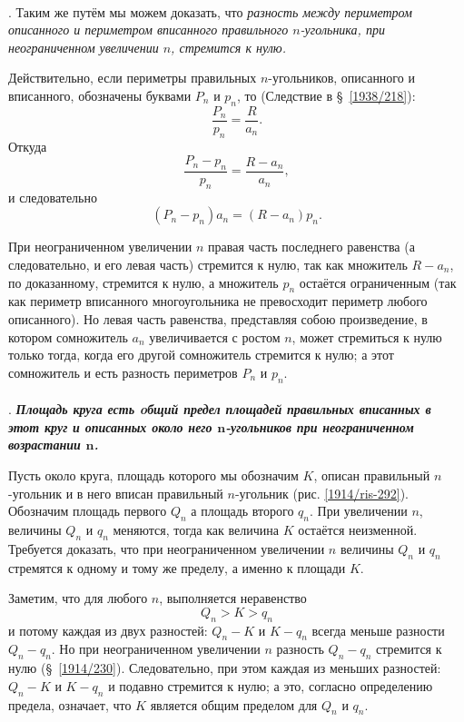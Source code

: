 {\small
\paragraph{}\label{1914/231}
.
Таким же путём мы можем доказать, что \emph{разность между периметром описанного и
периметром вписанного правильного $n$-угольника, при неограниченном увеличении $n$, стремится к нулю.}

Действительно, если периметры правильных $n$-угольников, описанного и вписанного, обозначены буквами $P_n$ и $p_n$, то (Следствие в §~\ref{1938/218}):
\[\frac {P_n}{p_n}=\frac R{a_n}.\]
Откуда
\[\frac{P_n-p_n}{p_n}=\frac{R-a_n}{a_n},\]
и следовательно
\[(P_n-p_n)a_n=(R-a_n)p_n.\]

При неограниченном увеличении $n$ правая часть последнего равенства (а следовательно, и его левая часть) стремится к нулю, так как множитель $R-a_n$, по доказанному, стремится к нулю, а множитель $p_n$ остаётся ограниченным (так как периметр вписанного многоугольника не превосходит периметр любого описанного).
Но левая часть равенства, представляя собою произведение, в котором сомножитель $a_n$ увеличивается с ростом $n$, может стремиться к нулю только тогда, когда его другой сомножитель  стремится к нулю;
а этот сомножитель и есть разность периметров $P_n$ и $p_n$.

}

\paragraph{}\label{1914/232} .
\textbf{\emph{Площадь круга есть oбщий предел площадей правильных вписанных в этот круг и описанных около него $\bm{n}$-угольников при неограниченном возрастании $\bm{n}$.}}

Пусть около круга, площадь которого мы обозначим $K$, описан правильный $n$-угольник и в него вписан правильный $n$-угольник (рис. \ref{1914/ris-292}).
Обозначим площадь первого $Q_n$ а площадь второго $q_n$.
При увеличении $n$, величины $Q_n$ и $q_n$ меняются, тогда как величина $K$ остаётся неизменной.
Требуется доказать, что при неограниченном увеличении $n$ величины $Q_n$ и $q_n$ стремятся к одному
и тому же пределу, а именно к площади $K$.

Заметим, что для любого $n$, выполняется неравенство 
\[Q_n>K>q_n\]
и потому каждая из двух разностей: 
$Q_n-K$ и $K-q_n$ всегда меньше разности $Q_n-q_n$.
Но при неограниченном увеличении $n$ разность $Q_n-q_n$ стремится к нулю (§~\ref{1914/230}).
Следовательно, при этом каждая из меньших разностей: $Q_n-K$ и $K-q_n$ и подавно стремится к нулю;
а это, согласно определению предела, означает, что $K$ является общим пределом для $Q_n$ и $q_n$.

